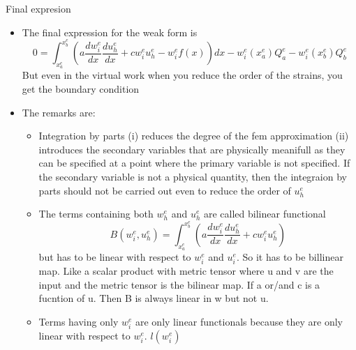 	\begin{frame}{Final expresion}
		\begin{itemize}
			\item The final expression for the weak form is 
			\begin{equation}
				0 = \int_{x_a^e}^{x_b^e} \left( a \frac{d w_i^e}{dx}\frac{du_h^e}{dx}  + cw^e_iu_h^e -w_i^ef(x) \right)  dx
				- w_i^e(x_a^e)Q_a^e - w_i^e(x_b^e)Q_b^e
			\end{equation}
			But even in the virtual work when you reduce the order of the strains, you get the boundary condition
			\item The remarks are:
			\begin{itemize}
				\item Integration by parts (i) reduces the degree of the fem approximation (ii) introduces the secondary variables that are physically meanifull as they can be specified at a point where the primary variable is not specified. If the secondary variable is not a physical quantity, then the integraion by parts should not be carried out even to reduce the order of $u_h^e$
				\item The terms containing both $w_h^e$ and $u_h^e$ are called bilinear functional 
				\begin{equation}
					B(w_i^e,u_h^e) = \int_{x_a^e}^{x_b^e} \left(a \frac{d w_i^e}{dx}\frac{du_h^e}{dx} + cw^e_iu_h^e \right)
				\end{equation}
				but has to be linear with respect to $w_i^e$ and $u_i^e$. So it has to be billinear map. Like a scalar product with metric tensor where u and v are the input and the metric tensor is the bilinear map. If a or/and c is a fucntion of u. Then B is always linear in w but not u.
				\item Terms having only $w_i^e$ are only linear functionals because they are only linear with respect to $w_i^e$. $l(w_i^e)$
				
			\end{itemize}
		\end{itemize}
	\end{frame}


